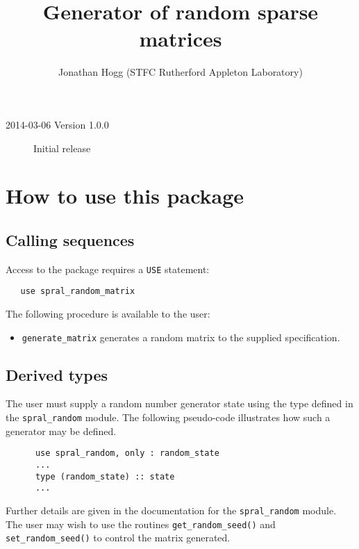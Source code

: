 
\title{Generator of random sparse matrices}
\author{Jonathan Hogg (STFC Rutherford Appleton Laboratory)}
\maketitle
\thispagestyle{firststyle}

\versionhistory
\begin{description}
\item[2014-03-06 Version 1.0.0] Initial release
\end{description}


\section{How to use this package}

\subsection{Calling sequences}

Access to the package requires a {\tt USE} statement:
\begin{verbatim}
   use spral_random_matrix
\end{verbatim}

\noindent
The following procedure is available to the user:
\begin{itemize}
\item {\tt generate\_matrix} generates a random matrix to the supplied
specification.
\end{itemize}


\subsection{Derived types} \label{derived types}

The user must supply a random number generator state using the type
defined in the \texttt{spral\_random} module. 
The following pseudo-code illustrates how such a generator may be defined.
\begin{verbatim}
      use spral_random, only : random_state
      ...
      type (random_state) :: state
      ...
\end{verbatim}
Further details are given in the documentation for the \texttt{spral\_random}
module. The user may wish to use the routines \texttt{get\_random\_seed()} and
\texttt{set\_random\_seed()} to control the matrix generated.

